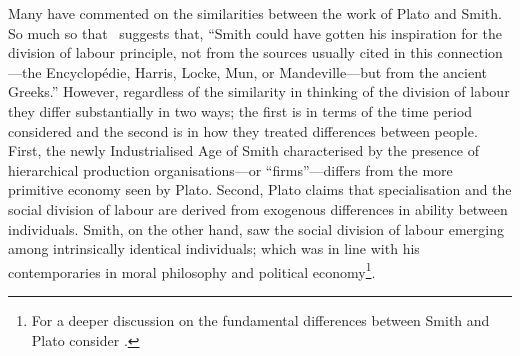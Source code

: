 Many have commented on the similarities between the work of Plato and Smith. So much so that~\citep[p.~221--222]{Foley1974} suggests that, ``Smith could have gotten his inspiration for the division of labour principle, not from the sources usually cited in this connection---the Encyclop\'{e}die, Harris, Locke, Mun, or Mandeville---but from the ancient Greeks.'' However, regardless of the similarity in thinking of the division of labour they differ substantially in two ways; the first is in terms of the time period considered and the second is in how they treated differences between people. First, the newly Industrialised Age of Smith characterised by the presence of hierarchical production organisations---or ``firms''---differs from the more primitive economy seen by Plato. Second, Plato claims that specialisation and the social division of labour are derived from exogenous differences in ability between individuals. Smith, on the other hand, saw the social division of labour emerging among intrinsically identical individuals; which was in line with his contemporaries in moral philosophy and political economy\footnote{For a deeper discussion on the fundamental differences between Smith and Plato consider \citep{McNulty1975}.}.




